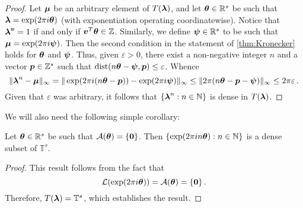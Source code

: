 \begin{proof}
Let $\boldsymbol{\mu}$ be an arbitrary element of $T(\boldsymbol{\lambda})$, and let $\boldsymbol{\theta} \in \mathbb{R}^{s}$ be such that $\boldsymbol{\lambda} = \exp(2 \pi i \boldsymbol{\theta})$ (with exponentiation operating coordinatewise). Notice that $\boldsymbol{\lambda}^{\boldsymbol{v}} = 1$ if and only if $\boldsymbol{v}^{T} \boldsymbol{\theta} \in \mathbb{Z}$.
Similarly, we define $\boldsymbol{\psi} \in \mathbb{R}^{s}$ to be such that $\boldsymbol{\mu}=\exp(2 \pi i \boldsymbol{\psi})$. Then the second condition in the statement of \cref{thm:Kronecker} holds for $\boldsymbol{\theta}$ and $\boldsymbol{\psi}$.
Thus, given $\varepsilon>0$, there exist a non-negative integer $n$ and a vector $\boldsymbol{p} \in \mathbb{Z}^{s}$ such that $\operatorname{dist}(n \boldsymbol{\theta} - \boldsymbol{\psi}, \boldsymbol{p}) \leq \varepsilon$.
Whence
\begin{equation*}
  \| \boldsymbol{\lambda}^{n}-\boldsymbol{\mu} \|_{\infty} = \| \exp( 2 \pi i (n\boldsymbol{\theta} - \boldsymbol{p})) - \exp(2 \pi i \boldsymbol{\psi}) \|_{\infty} \leq \| 2 \pi (n\boldsymbol{\theta} -\boldsymbol{p} - \boldsymbol{\psi}) \|_\infty \leq 2 \pi \varepsilon \, .
\end{equation*}
Given that $\varepsilon$ was arbitrary, it follows that $\lbrace \boldsymbol{\lambda}^{n} : n \in \mathbb{N} \rbrace$ is dense in $T(\boldsymbol{\lambda})$.
\end{proof}

We will also need the following simple corollary:
\begin{corollary}
  Let $\boldsymbol{\theta} \in \mathbb{R}^{s}$ be such that ${\mathcal{A}}(\boldsymbol{\theta}) = \lbrace \boldsymbol{0} \rbrace$. Then $\lbrace \exp(2 \pi i n \boldsymbol{\theta}) : n \in \mathbb{N} \rbrace$ is a dense subset of $\mathbb{T}^s$.
\label{corl:kronecker}
\end{corollary}
\begin{proof}
This result follows from the fact that
\begin{equation*}
  {\mathcal{L}}(\exp(2 \pi i \boldsymbol{\theta})) = {\mathcal{A}}(\boldsymbol{\theta}) = \lbrace \boldsymbol{0} \rbrace \, .
\end{equation*}
Therefore, $T(\boldsymbol{\lambda}) = \mathbb{T}^{s}$, which establishes the result.
\end{proof}

